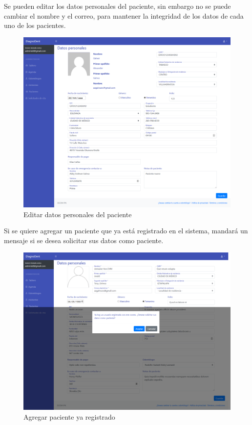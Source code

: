 \vspace{1em}
Se pueden editar los datos personales del paciente, sin embargo no se puede cambiar el nombre y el correo, para mantener la integridad de los datos de cada uno de los pacientes.

\begin{figure}[H]
\centering
\includegraphics[width=17cm,keepaspectratio]{pictures/adminodo/pacientes/datos/datos-personales-editar.png}
\caption{Editar datos personales del paciente}
\end{figure}

Si se quiere agregar un paciente que ya está registrado en el sistema, mandará un mensaje si se desea solicitar sus datos como paciente.

\begin{figure}[H]
\centering
\includegraphics[width=17cm,keepaspectratio]{pictures/adminodo/pacientes/datos/agregar-paciente-ya-registrado.png}
\caption{Agregar paciente ya registrado}
\end{figure}

